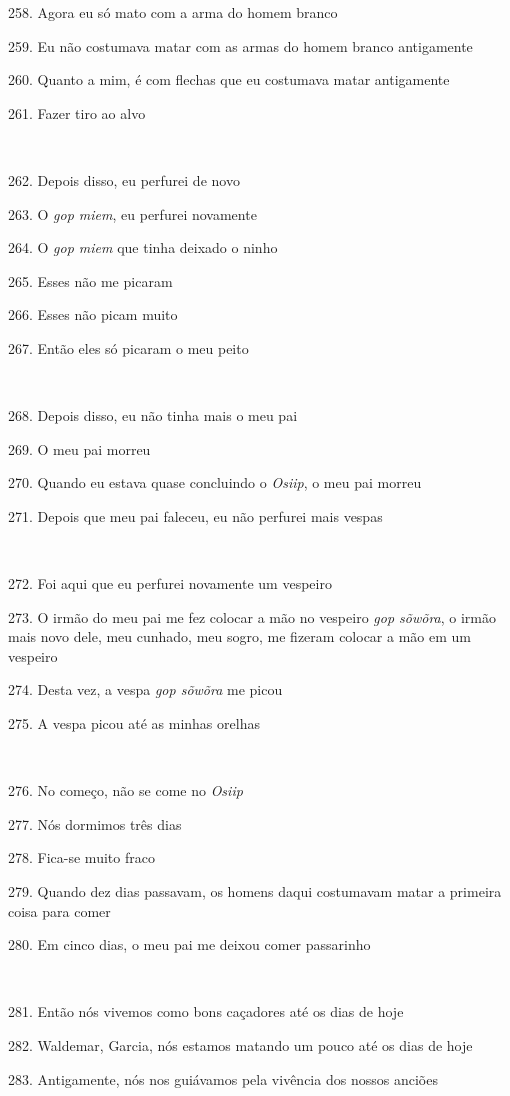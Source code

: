 258. Agora eu só mato com a arma do homem branco

259. Eu não costumava matar com as armas do homem branco antigamente

260. Quanto a mim, é com flechas que eu costumava matar antigamente

261. Fazer tiro ao alvo

~

262. Depois disso, eu perfurei de novo

263. O \emph{gop miem}, eu perfurei novamente

264. O \emph{gop miem} que tinha deixado o ninho

265. Esses não me picaram

266. Esses não picam muito

267. Então eles só picaram o meu peito

~

268. Depois disso, eu não tinha mais o meu pai

269. O meu pai morreu

270. Quando eu estava quase concluindo o \emph{Osiip}, o meu pai morreu

271. Depois que meu pai faleceu, eu não perfurei mais vespas

~

272. Foi aqui que eu perfurei novamente um vespeiro

273. O irmão do meu pai me fez colocar a mão no vespeiro \emph{gop
sõwõra}, o irmão mais novo dele, meu cunhado, meu sogro, me fizeram
colocar a mão em um vespeiro

274. Desta vez, a vespa \emph{gop sõwõra} me picou

275. A vespa picou até as minhas orelhas

~

276. No começo, não se come no \emph{Osiip}

277. Nós dormimos três dias

278. Fica-se muito fraco

279. Quando dez dias passavam, os homens daqui costumavam matar a
primeira coisa para comer

280. Em cinco dias, o meu pai me deixou comer passarinho

~

281. Então nós vivemos como bons caçadores até os dias de hoje

282. Waldemar, Garcia, nós estamos matando um pouco até os dias de hoje

283. Antigamente, nós nos guiávamos pela vivência dos nossos anciões




